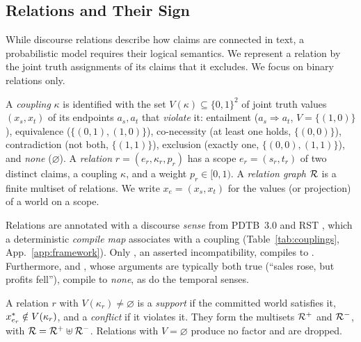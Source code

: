 \subsection{Relations and Their Sign}
\label{sec:taxonomy}

While discourse relations describe how claims are connected in text, a probabilistic model requires 
their logical semantics. We represent a relation by the joint truth assignments of its claims that 
it excludes. We focus on binary relations only.

\begin{definition}
\label{def:coupling}
\label{def:relation}
A \emph{coupling} $\kappa$ is identified with the set $V(\kappa)\subseteq\{0,1\}^2$ of joint
truth values $(x_s,x_t)$ of its endpoints $a_s,a_t$ that \emph{violate} it: entailment \ent{}
($a_s\Rightarrow a_t$, $V=\{(1,0)\}$), equivalence \eqv{} ($\{(0,1),(1,0)\}$), co-necessity \cnc{}
(at least one holds, $\{(0,0)\}$), contradiction \con{} (not both, $\{(1,1)\}$), exclusion \exc{}
(exactly one, $\{(0,0),(1,1)\}$), and \emph{none} ($\varnothing$). A \emph{relation}
$r=(e_r,\kappa_r,p_r)$ has a scope $e_r=(s_r,t_r)$ of two distinct claims, a coupling $\kappa$, and a weight
$p_r\in[0,1)$. A \emph{relation graph} $\mathcal{R}$ is a finite multiset of relations. We write
$x_e=(x_s,x_t)$ for the values (or projection) of a world on a scope.
\end{definition}


Relations are annotated with a discourse \emph{sense} from PDTB~3.0 and RST \citep{pdtb,mann},
which a deterministic \emph{compile map} associates with a coupling (Table~\ref{tab:couplings},
App.~\ref{app:framework}). Only
, an asserted incompatibility, compiles to \con{}. Furthermore,  and
, whose arguments are typically both true (``sales rose, but profits fell''),
compile to \emph{none}, as do the temporal senses.

\begin{definition}
\label{def:sign}
A relation $r$ with $V(\kappa_r)\neq\varnothing$ is a \emph{support} if the committed world
satisfies it, $x^{\ast}_{e_r}\notin V(\kappa_r)$, and a \emph{conflict} if it violates it. They form the
multisets $\mathcal{R}^{+}$ and $\mathcal{R}^{-}$, with $\mathcal{R}=\mathcal{R}^{+}\uplus\mathcal{R}^{-}$. Relations with $V=\varnothing$ produce no
factor and are dropped.
\end{definition}

